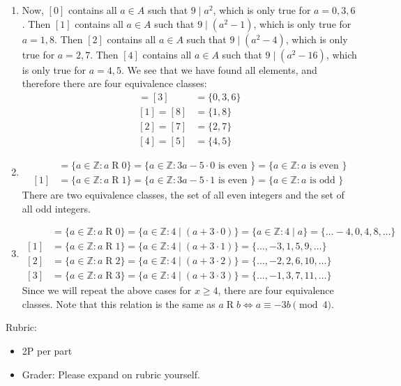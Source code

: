 \documentclass{article}
\newcommand{\Z}{\mathbb{Z}}
\theoremstyle{definition}
\begin{document}
\begin{solution}
	\begin{enumerate}
	\item Now, $[0]$ contains all $a \in A$ such that $9 \mid a^2$, which is only true for $a = 0, 3, 6$. Then $[1]$ contains all $a \in A$ such that $9 \mid (a^2 - 1)$, which is only true for $a = 1, 8$. Then $[2]$ contains all $a \in A$ such that $9 \mid (a^2 - 4)$, which is only true for $a = 2, 7$. Then $[4]$ contains all $a \in A$ such that $9 \mid (a^2 - 16)$, which is only true for $a = 4, 5$. We see that we have found all elements, and therefore there are four equivalence classes:
		\begin{align*}
		[0] = [3] &= \{ 0, 3, 6 \} \\
		[1] = [8] &= \{ 1, 8 \} \\
		[2] = [7] &= \{ 2, 7 \} \\
		[4] = [5] &= \{ 4, 5 \}
		\end{align*}
		
	\item 
		\begin{align*}
		[0] &= \{ a\in \Z : a\mathrel{R}0 \} = \{ a\in \Z :3a-5\cdot 0 \text{ is even }\} = \{ a\in \Z : a \text{ is even }\}\\
		[1] &= \{ a\in \Z : a\mathrel{R}1 \} = \{ a\in \Z :3a-5\cdot 1 \text{ is even }\} = \{ a\in \Z : a \text{ is odd }\}
		\end{align*}
		There are two equivalence classes, the set of all even integers and the set of all odd integers.
		
	\item 
		\begin{align*}
		[0] &= \{ a\in \Z : a\mathrel{R}0 \} = \{ a\in \Z : 4\mid (a+3\cdot 0)\} = \{ a\in \Z : 4\mid a \} = \{\dots -4, 0, 4, 8, \dots\}\\
		[1] &= \{ a\in \Z : a\mathrel{R}1 \} = \{ a\in \Z : 4\mid (a+3\cdot 1)\} = \{ \dots, -3, 1, 5, 9, \dots\}\\
		[2] &= \{ a\in \Z : a\mathrel{R}2 \} = \{ a\in \Z : 4\mid (a+3\cdot 2)\} = \{ \dots, -2, 2, 6, 10, \dots\}\\
		[3] &= \{ a\in \Z : a\mathrel{R}3 \} = \{ a\in \Z : 4\mid (a+3\cdot 3)\} = \{ \dots, -1, 3, 7, 11, \dots\}
		\end{align*}
		Since we will repeat the above cases for $x\geq 4$, there are four equivalence classes. Note that this relation is the same as $a\mathrel{R}b \iff a \equiv -3b \pmod{4}.$
	\end{enumerate}
	
{\color{red} Rubric:
\begin{itemize}
\item 2P per part
\item Grader: Please expand on rubric yourself.
\end{itemize}}
\end{solution}
\end{document}
